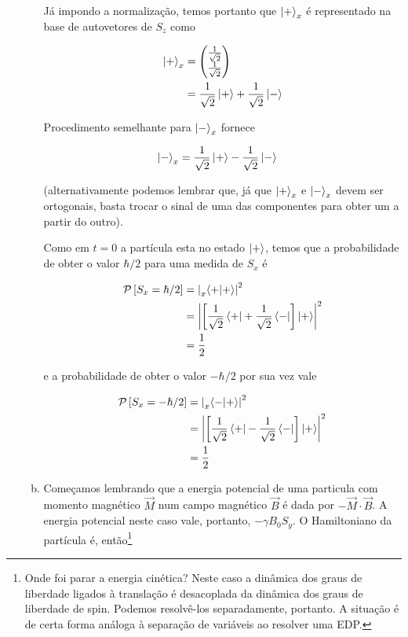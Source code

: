 \documentclass[a4paper, 12pt, notitlepage]{article}
\begin{document}
\begin{enumerate}
\begin{enumerate}[(a)]
Já impondo a normalização, temos portanto que $\ket{+}_x$ é representado na base de autovetores de $S_z$ como

\begin{align*}
 \ket{+}_x &= \begin{pmatrix} \frac{1}{\sqrt{2}} \\ \frac{1}{\sqrt{2}} \end{pmatrix} \\
  &= \frac{1}{\sqrt{2}} \ket{+} + \frac{1}{\sqrt{2}} \ket{-}
\end{align*}

Procedimento semelhante para $\ket{-}_x$ fornece

\begin{align*}
  \ket{-}_x &= \frac{1}{\sqrt{2}} \ket{+} - \frac{1}{\sqrt{2}} \ket{-}
\end{align*}

\noindent (alternativamente podemos lembrar que, já que $\ket{+}_x$ e $\ket{-}_x$ devem ser ortogonais, basta trocar o sinal de uma das componentes para obter um a partir do outro).

Como em $t = 0$ a partícula esta no estado $\ket{+}$, temos que a probabilidade de obter o valor $\hbar/2$ para uma medida de $S_x$ é

\begin{align*}
  \mathcal{P}\left[ S_x = \hslash/2\right] &= \left|\prescript{}{x}{\left\langle +|+\right\rangle}\right|^2 \\
  &= \left|\left[ \frac{1}{\sqrt{2}} \bra{+} + \frac{1}{\sqrt{2}} \bra{-} \right] \ket{+}\right|^2 \\
  &= \frac{1}{2}
\end{align*}

\noindent e a probabilidade de obter o valor $-\hbar/2$ por sua vez vale

\begin{align*}
  \mathcal{P}\left[ S_x = -\hslash/2\right] &= \left|\prescript{}{x}{\left\langle -|+\right\rangle}\right|^2 \\
  &= \left| \left[\frac{1}{\sqrt{2}}\bra{+} - \frac{1}{\sqrt{2}}\bra{-} \right]\ket{+}\right|^2 \\
  &= \frac{1}{2}
\end{align*}

\item Começamos lembrando que a energia potencial de uma particula com momento magnético $\vec{M}$ num campo magnético $\vec{B}$ é dada por $-\vec{M}\cdot\vec{B}$. A energia potencial neste caso vale, portanto, $-\gamma B_0 S_y$. O Hamiltoniano da partícula é, então\footnote{Onde foi parar a energia cinética? Neste caso a dinâmica dos graus de liberdade ligados à translação é desacoplada da dinâmica dos graus de liberdade de spin. Podemos resolvê-los separadamente, portanto. A situação é de certa forma análoga à separação de variáveis ao resolver uma EDP.}


\end{enumerate}
\end{enumerate}
\end{document}
